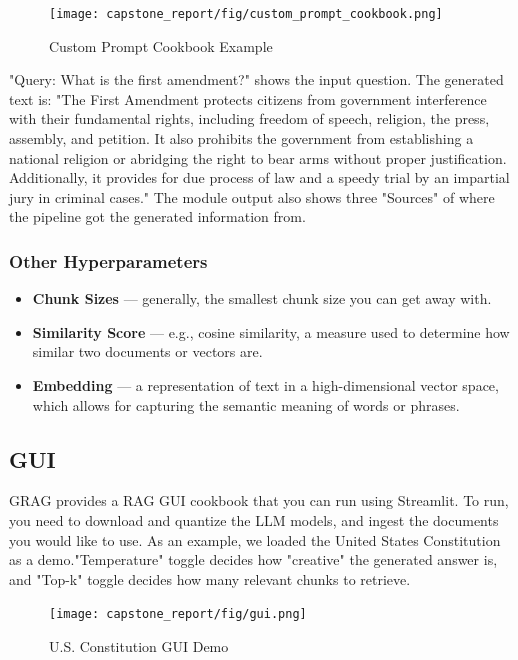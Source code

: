 \documentclass{scrartcl}
\begin{document}
\begin{figure}[H]
    \centering
    \texttt{[image: capstone\_report/fig/custom\_prompt\_cookbook.png]}
    \caption{Custom Prompt Cookbook Example}
\end{figure}
\newpage
\noindent "Query: What is the first amendment?" shows the input question.
\newline
\newline
The generated text is: "The First Amendment protects citizens from government interference with their fundamental rights, including freedom of speech, religion, the press, assembly, and petition. It also prohibits the government from establishing a national religion or abridging the right to bear arms without proper justification. Additionally, it provides for due process of law and a speedy trial by an impartial jury in criminal cases."
\newline
\newline
The module output also shows three "Sources" of where the pipeline got the generated information from.

\subsubsection{Other Hyperparameters}
\begin{itemize}
    \item \textbf{Chunk Sizes} --- generally, the smallest chunk size you can get away with.
    \item \textbf{Similarity Score} --- e.g., cosine similarity, a measure used to determine how similar two documents or vectors are.
    \item \textbf{Embedding} --- a representation of text in a high-dimensional vector space, which allows for capturing the semantic meaning of words or phrases.
\end{itemize}

\subsection{GUI}
GRAG provides a RAG GUI cookbook that you can run using Streamlit. To run, you need to download and quantize the LLM models, and ingest the documents you would like to use. As an example, we loaded the United States Constitution as a demo."Temperature" toggle decides how "creative" the generated answer is, and "Top-k" toggle decides how many relevant chunks to retrieve.

\begin{figure}[H]
    \centering
    \texttt{[image: capstone\_report/fig/gui.png]}
    \caption{U.S. Constitution GUI Demo}

\end{figure}
\newline
\end{document}
